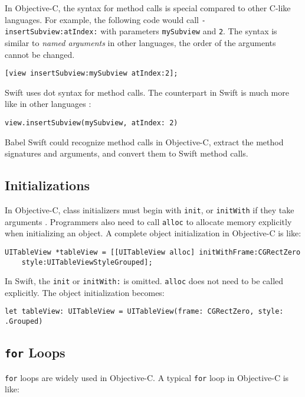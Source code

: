 \documentclass{sfuthesis}
\begin{document}
In Objective-C, the syntax for method calls is special compared to other C-like languages. For example, the following code would call \texttt{- insertSubview:atIndex:} with parameters \texttt{mySubview} and \texttt{2}. The syntax is similar to \emph{named arguments} in other languages, the order of the arguments cannot be changed.

\begin{verbatim}
[view insertSubview:mySubview atIndex:2];
\end{verbatim}

Swift uses dot syntax for method calls. The counterpart in Swift is much more like in other languages \cite{swiftobjcapis}:

\begin{verbatim}
view.insertSubview(mySubview, atIndex: 2)
\end{verbatim}

Babel Swift could recognize method calls in Objective-C, extract the method signatures and arguments, and convert them to Swift method calls.

\subsection{Initializations}

In Objective-C, class initializers must begin with \texttt{init}, or \texttt{initWith} if they take arguments \cite{objcinit}. Programmers also need to call \texttt{alloc} to allocate memory explicitly when initializing an object. A complete object initialization in Objective-C is like:

\begin{verbatim}
UITableView *tableView = [[UITableView alloc] initWithFrame:CGRectZero
    style:UITableViewStyleGrouped];
\end{verbatim}

In Swift, the \texttt{init} or \texttt{initWith:} is omitted. \texttt{alloc} does not need to be called explicitly. The object initialization becomes:

\begin{verbatim}
let tableView: UITableView = UITableView(frame: CGRectZero, style: .Grouped)
\end{verbatim}

\subsection{\texttt{for} Loops}

\texttt{for} loops are widely used in Objective-C. A typical \texttt{for} loop in Objective-C is like:
\end{document}
